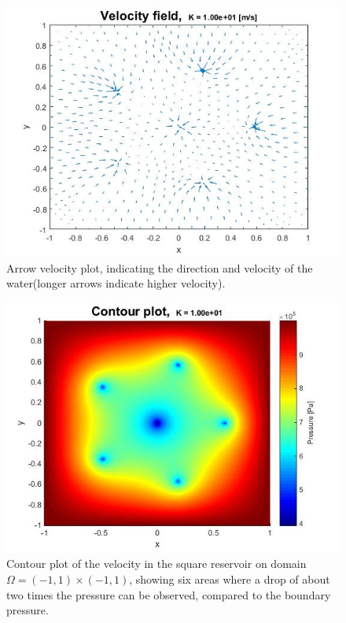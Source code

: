 \documentclass[a4paper]{report}
\begin{document}
\begin{figure}[ht!]
	\centering
	\includegraphics[width=130mm]{2Dvarrowsk10.jpg}
	\caption{Arrow velocity plot, indicating the direction and velocity of the water(longer arrows indicate higher velocity).
	\label{overflow}}
\end{figure}

\begin{figure}
	\centering
	\includegraphics[width=130mm]{K10_contour.jpg}
	\caption{Contour plot of the velocity in the square reservoir on domain $\Omega=(-1,1)\times(-1,1)$, showing six areas where a drop of about two times the pressure can be observed, compared to the boundary pressure.
	\label{overflow}}
\end{figure}
\end{document}
